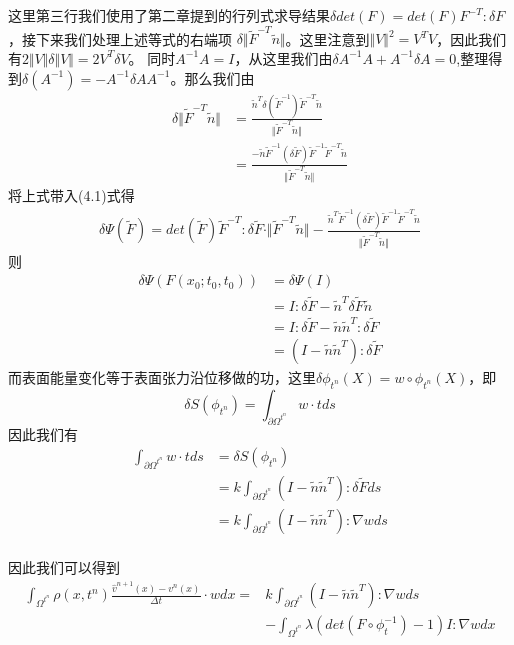 这里第三行我们使用了第二章提到的行列式求导结果$\delta det(F) = det(F)F^{-T}:\delta F$，接下来我们处理上述等式的右端项
$\delta \Vert \tilde{F}^{-T}\tilde{n}\Vert$。这里注意到$\Vert V \Vert^2 = V^TV$，因此我们有$2\Vert V\Vert \delta \Vert V \Vert = 2V^T\delta V$。
同时$A^{-1}A = I$，从这里我们由$\delta A^{-1} A + A^{-1}\delta A = 0$,整理得到$\delta (A^{-1}) = - A^{-1}\delta A A^{-1}$。那么我们由
\begin{align*}
    \delta \Vert \tilde{F}^{-T}\tilde{n}\Vert &= \frac{\tilde{n}^{T}\delta(\tilde{F}^{-1})\tilde{F}^{-T}\tilde{n}}{\Vert \tilde{F}^{-T}\tilde{n}\Vert}\\
    &= \frac{-\tilde{n}\tilde{F}^{-1}(\delta \tilde{F})\tilde{F}^{-1}\tilde{F}^{-T}\tilde{n}}{\Vert \tilde{F}^{-T}\tilde{n} \Vert}
\end{align*}
将上式带入(4.1)式得
\begin{align*}
    \delta \Psi(\tilde{F}) = det(\tilde{F})\tilde{F}^{-T}:\delta \tilde{F} \cdot \Vert \tilde{F}^{-T}\tilde{n}\Vert - \frac{\tilde{n}^T\tilde{F}^{-1}(\delta \tilde{F})\tilde{F}^{-1}\tilde{F}^{-T}\tilde{n}}{\Vert \tilde{F}^{-T}\tilde{n} \Vert}
\end{align*}
则
\begin{align*}
    \delta \Psi (F(x_0;t_0,t_0)) &= \delta \Psi(I)\\ 
    &= I:\delta \tilde{F} - \tilde{n}^T\delta \tilde{F} \tilde{n}\\
    &= I:\delta \tilde{F} - \tilde{n}\tilde{n}^T:\delta \tilde{F}\\
    &= (I - \tilde{n}\tilde{n}^T):\delta \tilde{F}
\end{align*}
而表面能量变化等于表面张力沿位移做的功，这里$\delta \phi_{t^n} (X) = w\circ\phi_{t^n}(X)$，即
$$\delta S(\phi_{t^n}) = \int_{\partial \Omega^{t^n}} w\cdot t ds$$
因此我们有
\begin{align*}
    \int_{\partial \Omega^{t^n}} w\cdot t ds &= \delta S(\phi_{t^n})\\
    &= k\int_{\partial \Omega^{t^n}} (I - \tilde{n}\tilde{n}^{T}):\delta \tilde{F}ds\\
    &= k\int_{\partial \Omega^{t^n}} (I - \tilde{n}\tilde{n}^{T}):\nabla w ds\\
\end{align*}

因此我们可以得到
\begin{align}
    \int_{\Omega^{t^n}}\rho(x,t^n)\frac{\hat{v}^{n+1}(x) - v^n(x)}{\Delta t}\cdot wdx = &k\int_{\partial \Omega^{t^n}} (I - \tilde{n}\tilde{n}^T):\nabla w ds\nonumber\\
    & -\int_{\Omega^{t^n}}\lambda (det(F\circ \phi_t^{-1}) - 1)I:\nabla w dx
\end{align}
